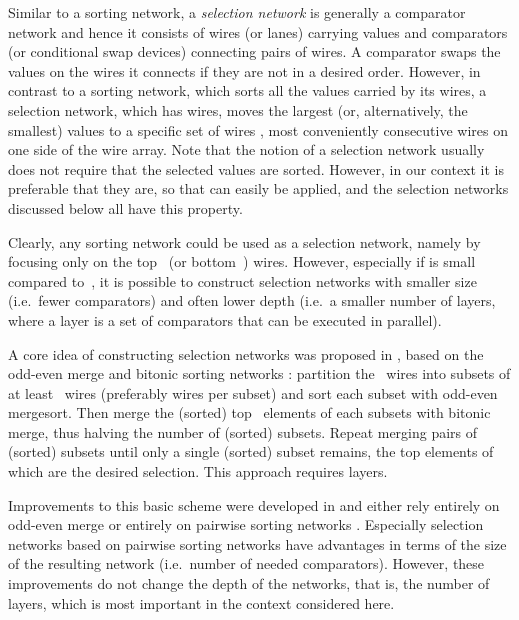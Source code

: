 \documentclass{article}
\begin{document}
\begin{table}[t]
Similar to a sorting network, a \emph{selection network} is generally
a comparator network and hence it consists of wires (or lanes) carrying
values and comparators (or conditional swap devices) connecting pairs
of wires. A comparator swaps the values on the wires it connects if they
are not in a desired order. However, in contrast to a sorting network,
which sorts all the values carried by its wires, a  selection
network, which has  wires, moves the  largest (or, alternatively,
the  smallest) values to a specific set of wires \citep{Knuth1998-3-SortingSearching},
most conveniently consecutive wires on one side of the wire array.
Note that the notion of a selection network usually does not require
that the selected values are sorted. However, in our context it is
preferable that they are, so that  can easily be applied, and
the selection networks discussed below all have this property.

Clearly, any sorting network could be used as a selection network,
namely by focusing only on the top~ (or bottom~) wires. However,
especially if  is small compared to~, it is possible to construct
selection networks with smaller size (i.e.\ fewer comparators) and often
lower depth (i.e.\ a smaller number of layers, where a layer is a set of
comparators that can be executed in parallel).

A core idea of constructing selection networks was proposed in
\citep{Wah_and_Chen_1984}, based on the odd-even merge and bitonic sorting
networks \citep{Batcher_1968}: partition the ~wires into subsets of at
least~ wires (preferably  wires per subset)
and sort each subset with odd-even mergesort. Then merge the (sorted)
top~ elements of each subsets with bitonic merge, thus halving the
number of (sorted) subsets. Repeat merging pairs of (sorted) subsets
until only a single (sorted) subset remains, the top  elements of
which are the desired selection. This approach requires
 layers.

Improvements to this basic scheme were developed in
\citep{Zazon-Ivry_and_Codish_2012,Karpinski_and_Piotrow_2015} and either rely
entirely on odd-even merge \citep{Batcher_1968} or entirely on pairwise
sorting networks \citep{Parberry_1992}. Especially selection networks based on
pairwise sorting networks have advantages in terms of the size of the
resulting network (i.e.\ number of needed comparators). However, these
improvements do not change the depth of the networks, that is, the
number of layers, which is most important in the context considered
here.




\end{table}
\end{document}

